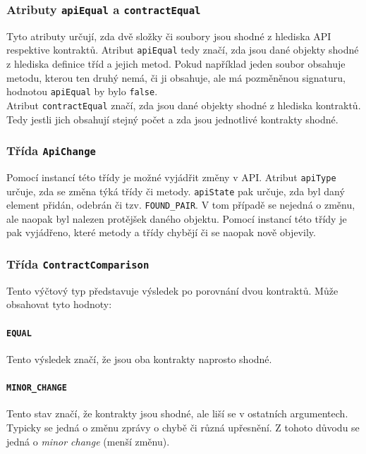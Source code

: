 					\subsubsection{Atributy \texttt{apiEqual} a \texttt{contractEqual}}
						Tyto atributy určují, zda dvě složky či soubory jsou shodné z hlediska API respektive kontraktů. Atribut \texttt{apiEqual} tedy značí, zda jsou dané objekty shodné z hlediska definice tříd a jejich metod. Pokud například jeden soubor obsahuje metodu, kterou ten druhý nemá, či ji obsahuje, ale má pozměněnou signaturu, hodnotou \texttt{apiEqual} by bylo \texttt{false}.\\
						
						Atribut \texttt{contractEqual} značí, zda jsou dané objekty shodné z hlediska kontraktů. Tedy jestli jich obsahují stejný počet a zda jsou jednotlivé kontrakty shodné.
		
					\subsubsection{Třída \texttt{ApiChange}}
						Pomocí instancí této třídy je možné vyjádřit změny v API. Atribut \texttt{apiType} určuje, zda se změna týká třídy či metody. \texttt{apiState} pak určuje, zda byl daný element přidán, odebrán či tzv. \texttt{FOUND\_PAIR}. V tom případě se nejedná o změnu, ale naopak byl nalezen protějšek daného objektu. Pomocí instancí této třídy je pak vyjádřeno, které metody a třídy chybějí či se naopak nově objevily.
						
					\subsubsection{Třída \texttt{ContractComparison}}
						Tento výčtový typ představuje výsledek po porovnání dvou kontraktů. Může obsahovat tyto hodnoty:
						
						\paragraph{\texttt{EQUAL}}
							Tento výsledek značí, že jsou oba kontrakty naprosto shodné.
						
						\paragraph{\texttt{MINOR\_CHANGE}}
							Tento stav značí, že kontrakty jsou shodné, ale liší se v ostatních argumentech. Typicky se jedná o změnu zprávy o chybě či různá upřesnění. Z tohoto důvodu se jedná o \emph{minor change} (menší změnu).
							
